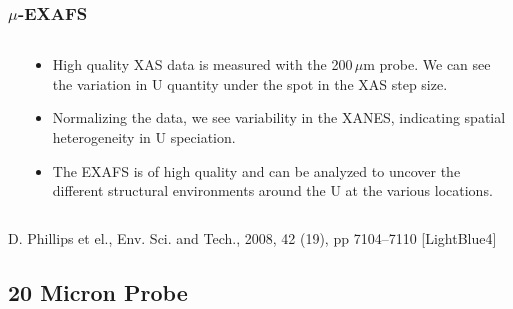 \documentclass[10pt, xcolor=x11names, compress]{beamer}
\begin{document}
\begin{frame}
  \frametitle{$\mu$-EXAFS}

  \begin{columns}[T]
    \begin{column}{0.34\linewidth}


    \end{column}
    \begin{column}{0.66\linewidth}
      \begin{itemize}[<+->]
      \item High quality XAS data is measured with the 200\,$\mu$m
        probe.  We can see the variation in U quantity under the spot
        in the XAS step size.\\[10ex]
      \item Normalizing the data, we see variability in the XANES,
        indicating spatial heterogeneity in U speciation.\\[10ex]
      \item The EXAFS is of high quality and can be analyzed to
        uncover the different structural environments around the U at
        the various locations.
      \end{itemize}
    \end{column}
  \end{columns}
  \begin{bottomnote}[0.5][19.75]
    D. Phillips et el., Env. Sci. and Tech., 2008, 42 (19), pp
    7104–7110
    [LightBlue4]
  \end{bottomnote}
\end{frame}

\subsection[20 $\mu$m]{20 Micron Probe}
\end{document}
